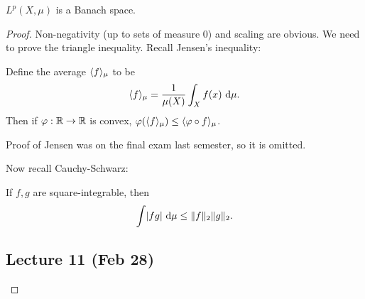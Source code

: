\documentclass[10pt, twoside]{article}
\renewcommand{\d}{\ \mathrm{d}}
\begin{document}
    \begin{thm}
        $L^p(X,\mu)$ is a Banach space.
        \begin{proof}
            Non-negativity (up to sets of measure $0$) and scaling are obvious. We need to prove the triangle inequality. Recall Jensen's inequality:
            \begin{mdframed}[style=default]
                \begin{thm}
                Define the average $\langle f\rangle_{\mu}$ to be \[\gen{f}_{\mu} = \frac{1}{\mu(X)} \int_X f(x) \d \mu.\] Then if $\varphi: \mathbb{R} \to \mathbb{R}$ is convex, $\varphi(\langle f\rangle_{\mu}) \leq \langle\varphi \circ f\rangle_{\mu}$.
                \end{thm}
                Proof of Jensen was on the final exam last semester, so it is omitted.
            \end{mdframed}
            Now recall Cauchy-Schwarz:
            \begin{mdframed}[style=default]
                \begin{thm}
                    If $f,g$ are square-integrable, then \[ \int \abs{fg} \d \mu \leq \norm{f}_2 \norm{g}_2. \]
                \end{thm}
            \end{mdframed}
            
            \subsection{Lecture 11 (Feb 28)}
            

\end{proof}
\end{thm}
\end{document}
